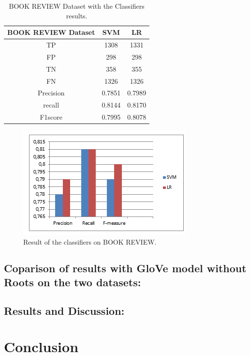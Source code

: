 \documentclass[conference]{IEEEtran}
\begin{document}
	
	\begin{table}[!ht]
		\large        %
		\caption{BOOK REVIEW  Dataset with the Classifiers results.}\label{label}
		\centering    %
		\begin{tabular}{|c|c|c|}
			\hline
			BOOK REVIEW Dataset&SVM&LR\\     %
			\hline
			TP&1308&1331\\
			\hline
			FP&298&298\\
			\hline
			TN&358&355\\
			\hline
			FN&1326&1326\\
			\hline
			Precision&0.7851&0.7989\\
			\hline
			recall&0.8144&0.8170\\
			\hline
			F1score&0.7995&0.8078\\
			\hline
		\end{tabular}
	\end{table}
	
	\begin{figure}[htpb]
		
		\centerline{\includegraphics{fig4.png}}
		\caption{Result of the classifiers on BOOK REVIEW.}
		\label{fig}
		
	\end{figure}
	\subsection{Coparison of results with GloVe model without Roots on the two datasets:}\label{AA}
	
	\subsection{Results and Discussion:}\label{AA}
	
	
	\section{Conclusion}
	
	
	
	
	
	
\end{document}

